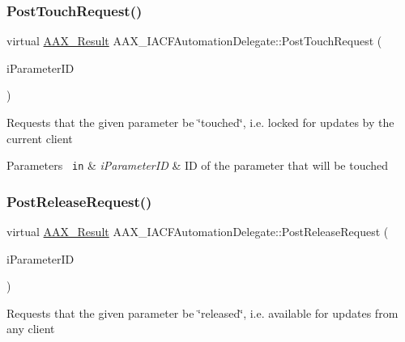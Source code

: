 \subsubsection{\texorpdfstring{PostTouchRequest()}{PostTouchRequest()}}
{\footnotesize\ttfamily virtual \mbox{\hyperlink{a00392_a4d8f69a697df7f70c3a8e9b8ee130d2f}{A\+A\+X\+\_\+\+Result}} A\+A\+X\+\_\+\+I\+A\+C\+F\+Automation\+Delegate\+::\+Post\+Touch\+Request (\begin{DoxyParamCaption}\item[{\mbox{\hyperlink{a00392_a1440c756fe5cb158b78193b2fc1780d1}{A\+A\+X\+\_\+\+C\+Param\+ID}}}]{i\+Parameter\+ID }\end{DoxyParamCaption})\hspace{0.3cm}{\ttfamily [pure virtual]}}





Requests that the given parameter be \char`\"{}touched\char`\"{}, i.\+e. locked for updates by the current client


\begin{DoxyParams}[1]{Parameters}
\mbox{\texttt{ in}}  & {\em i\+Parameter\+ID} & ID of the parameter that will be touched \\
\hline
\end{DoxyParams}
\mbox{\label{a01617_a192c9c9a4af9c29caa763753f59fa59a}} 
\subsubsection{\texorpdfstring{PostReleaseRequest()}{PostReleaseRequest()}}
{\footnotesize\ttfamily virtual \mbox{\hyperlink{a00392_a4d8f69a697df7f70c3a8e9b8ee130d2f}{A\+A\+X\+\_\+\+Result}} A\+A\+X\+\_\+\+I\+A\+C\+F\+Automation\+Delegate\+::\+Post\+Release\+Request (\begin{DoxyParamCaption}\item[{\mbox{\hyperlink{a00392_a1440c756fe5cb158b78193b2fc1780d1}{A\+A\+X\+\_\+\+C\+Param\+ID}}}]{i\+Parameter\+ID }\end{DoxyParamCaption})\hspace{0.3cm}{\ttfamily [pure virtual]}}





Requests that the given parameter be \char`\"{}released\char`\"{}, i.\+e. available for updates from any client


